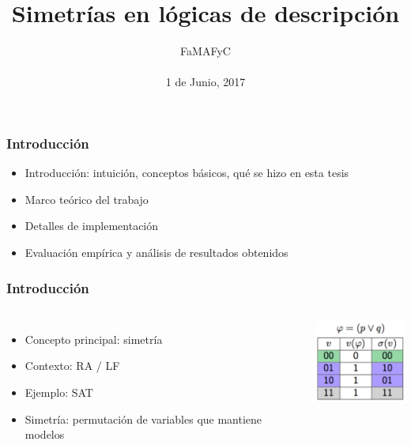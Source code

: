 \documentclass[compress,xcolor=dvipsnames]{beamer}
\title{Simetrías en lógicas de descripción}
\institute[Giovanni Rescia]{\large Giovanni Rescia}
\date{\small FaMAFyC\\~\\1 de Junio, 2017}
\theoremstyle{definition}
\begin{document}
\beamerdefaultoverlayspecification{}

\newcommand{\tup}[1]{\langle #1 \rangle}
\newcommand{\cset}[1]{\{ #1 \}}
\newcommand{\csetsc}[2]{\{#1 \mid #2\}}
\newcommand{\PROP}{\textsf{PROP}\xspace}
\newcommand{\REL}{\textsf{REL}\xspace}
\newcommand{\cA}{\mathcal{A}\xspace}
\newcommand{\cD}{\mathcal{D}\xspace}
\newcommand{\cI}{\mathcal{I}\xspace}
\newcommand{\cM}{\mathcal{M}\xspace}
\newcommand{\cN}{\mathcal{N}\xspace}
\newcommand{\cS}{\mathcal{S}\xspace}
\newcommand{\Diam}[1]{\tup{#1}}
\newcommand{\st}{\textsf{ST}\xspace}
\newcommand{\flechita}{\leftrightsquigarrow}
\newcommand{\diam}[1]{\langle #1 \rangle}
\newcommand{\model}{\mathcal{M}}

\begin{frame}[plain]
\titlepage{}
\end{frame}
\begin{frame}
\frametitle{Introducción}
\begin{itemize}
\item Introducción: intuición, conceptos básicos, qué se hizo en esta tesis
\item Marco teórico del trabajo
\item Detalles de implementación
\item Evaluación empírica y análisis de resultados obtenidos
\end{itemize}
\end{frame}

\begin{frame}
	\frametitle{Introducción}
  \begin{block}{}
    \begin{columns}[onlytextwidth,T]
      \column{\dimexpr\linewidth-30mm-5mm}
		\begin{itemize}[<+->]
			\item Concepto principal: simetría
			\item Contexto: RA / LF
			\item Ejemplo: SAT
			\item Simetría: permutación de variables que mantiene modelos
		\end{itemize}
		\onslide<+->
      	\column{30mm}
      	\includegraphics[width=30mm]{gfx/sym_ex}
    \end{columns}
  \end{block}
\end{frame}
\end{document}
